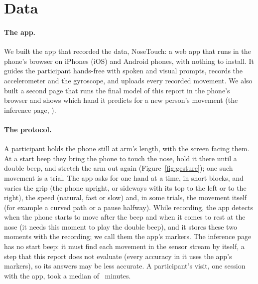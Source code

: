 \section{Data}\label{sec:data}

\paragraph{The app.} We built the app that recorded the data, NoseTouch: a web app that runs in the phone's browser
on iPhones (iOS) and Android phones, with nothing to install. It guides the participant hands-free with spoken and
visual prompts, records the accelerometer and the gyroscope, and uploads every recorded movement. We also built a
second page that runs the final model of this report in the phone's browser and shows which hand it predicts for a
new person's movement (the inference page, \predictorlink).

\paragraph{The protocol.} A participant holds the phone still at arm's length, with the screen facing them. At a
start beep they bring the phone to touch the nose, hold it there until a double beep, and stretch the arm out again
(Figure~\ref{fig:gesture}); one such movement is a trial. The app asks for one hand at a time, in short blocks, and
varies the grip (the phone upright, or sideways with its top to the left or to the right), the speed (natural, fast or
slow) and, in some trials, the movement itself (for example a curved path or a pause halfway). While recording, the
app detects when the phone starts to move after the beep and when it comes to rest at the nose (it needs this moment
to play the double beep), and it stores these two moments with the recording; we call them the app's markers. The
inference page has no start beep: it must find each movement in the sensor stream by itself, a step that this report
does not evaluate (every accuracy in it uses the app's markers), so its answers may be less accurate. A participant's
visit, one session with the app, took a median of ~minutes.

